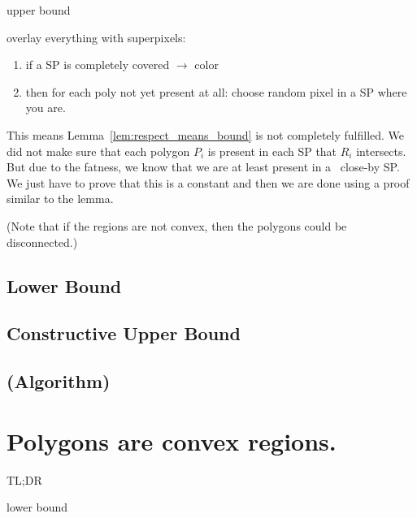 \documentclass[a4paper, UKenglish]{lipics-v2018}
\begin{document}
upper bound

overlay everything with superpixels:
\begin{enumerate}
	\item if a SP is completely covered $\rightarrow$ color
	\item then for each poly not yet present at all: choose random pixel in a SP where you are.
\end{enumerate}
This means Lemma~\ref{lem:respect_means_bound} is not completely fulfilled. We did not make sure that each polygon $P_i$ is present in each SP that $R_i$ intersects. But due to the fatness, we know that we are at least present in a ~close-by SP. We just have to prove that this is a constant and then we are done using a proof similar to the lemma.


(Note that if the regions are not convex, then the polygons could be disconnected.)


\subsection{Lower Bound}
\label{sub:fat_lower}




\subsection{Constructive Upper Bound}
\label{sub:fat_upper}




\subsection{(Algorithm)}
\label{sub:fat_algo}






\section{Polygons are convex regions.}
\label{sec:convex}

TL;DR

lower bound
\end{document}
